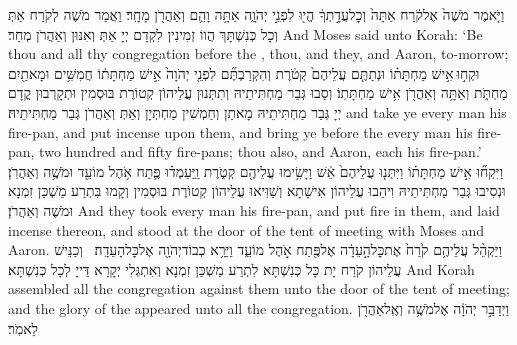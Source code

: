 {וַיֹּ֤אמֶר מֹשֶׁה֙ אֶל\maqqaf קֹ֔רַח אַתָּה֙ וְכׇל\maqqaf עֲדָ֣תְךָ֔ הֱי֖וּ לִפְנֵ֣י יְהֹוָ֑ה אַתָּ֥ה וָהֵ֛ם וְאַהֲרֹ֖ן מָחָֽר׃}
{וַאֲמַר מֹשֶׁה לְקֹרַח אַתְּ וְכָל כְּנִשְׁתָּךְ הֲווֹ זְמִינִין לִקְדָם יְיָ אַתְּ וְאִנּוּן וְאַהֲרֹן מְחַר׃}
{And Moses said unto Korah: ‘Be thou and all thy congregation before the \lord, thou, and they, and Aaron, to-morrow;}{}
{וּקְח֣וּ \legarmeh  אִ֣ישׁ מַחְתָּת֗וֹ וּנְתַתֶּ֤ם עֲלֵיהֶם֙ קְטֹ֔רֶת וְהִקְרַבְתֶּ֞ם לִפְנֵ֤י יְהֹוָה֙ אִ֣ישׁ מַחְתָּת֔וֹ חֲמִשִּׁ֥ים וּמָאתַ֖יִם מַחְתֹּ֑ת וְאַתָּ֥ה וְאַהֲרֹ֖ן אִ֥ישׁ מַחְתָּתֽוֹ׃}
{וְסַבוּ גְּבַר מַחְתִּיתֵיהּ וְתִתְּנוּן עֲלֵיהוֹן קְטוֹרֶת בּוּסְמִין וּתְקָרְבוּן קֳדָם יְיָ גְּבַר מַחְתִּיתֵיהּ מָאתַן וְחַמְשִׁין מַחְתְּיָן וְאַתְּ וְאַהֲרֹן גְּבַר מַחְתִּיתֵיהּ׃}
{and take ye every man his fire-pan, and put incense upon them, and bring ye before the \lord\space every man his fire-pan, two hundred and fifty fire-pans; thou also, and Aaron, each his fire-pan.’}{}
{וַיִּקְח֞וּ אִ֣ישׁ מַחְתָּת֗וֹ וַיִּתְּנ֤וּ עֲלֵיהֶם֙ אֵ֔שׁ וַיָּשִׂ֥ימוּ עֲלֵיהֶ֖ם קְטֹ֑רֶת וַֽיַּעַמְד֗וּ פֶּ֛תַח אֹ֥הֶל מוֹעֵ֖ד וּמֹשֶׁ֥ה וְאַהֲרֹֽן׃}
{וּנְסִיבוּ גְּבַר מַחְתִּיתֵיהּ וִיהַבוּ עֲלֵיהוֹן אִישָׁתָא וְשַׁוִּיאוּ עֲלֵיהוֹן קְטוֹרֶת בּוּסְמִין וְקָמוּ בִּתְרַע מַשְׁכַּן זִמְנָא וּמֹשֶׁה וְאַהֲרֹן׃}
{And they took every man his fire-pan, and put fire in them, and laid incense thereon, and stood at the door of the tent of meeting with Moses and Aaron.}{}
{וַיַּקְהֵ֨ל עֲלֵיהֶ֥ם קֹ֙רַח֙ אֶת\maqqaf כׇּל\maqqaf הָ֣עֵדָ֔ה אֶל\maqqaf פֶּ֖תַח אֹ֣הֶל מוֹעֵ֑ד וַיֵּרָ֥א כְבוֹד\maqqaf יְהֹוָ֖ה אֶל\maqqaf כׇּל\maqqaf הָעֵדָֽה׃ \setuma }
{וְכַנֵּישׁ עֲלֵיהוֹן קֹרַח יָת כָּל כְּנִשְׁתָּא לִתְרַע מַשְׁכַּן זִמְנָא וְאִתְגְּלִי יְקָרָא דַּייָ לְכָל כְּנִשְׁתָּא׃}
{And Korah assembled all the congregation against them unto the door of the tent of meeting; and the glory of the \lord\space appeared unto all the congregation.}{}
{וַיְדַבֵּ֣ר יְהֹוָ֔ה אֶל\maqqaf מֹשֶׁ֥ה וְאֶֽל\maqqaf אַהֲרֹ֖ן לֵאמֹֽר׃}
